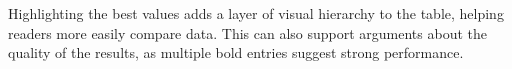 


\noindent Highlighting the best values adds a layer of visual hierarchy to the table, helping readers more easily compare data.
This can also support arguments about the quality of the results, as multiple bold entries suggest strong performance.
